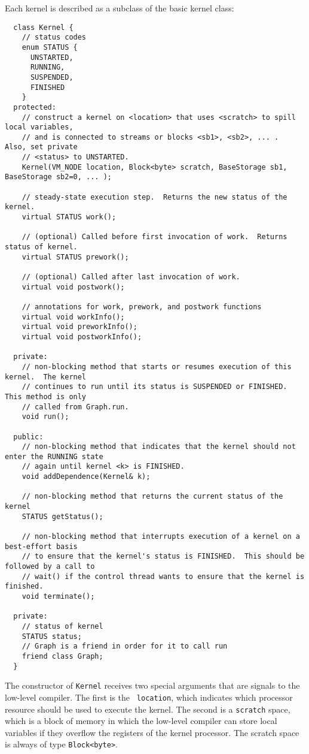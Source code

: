 Each kernel is described as a subclass of the basic kernel class:
{\small
\begin{verbatim}
  class Kernel {
    // status codes
    enum STATUS {
      UNSTARTED,
      RUNNING,
      SUSPENDED,
      FINISHED
    }
  protected:
    // construct a kernel on <location> that uses <scratch> to spill local variables,
    // and is connected to streams or blocks <sb1>, <sb2>, ... .  Also, set private 
    // <status> to UNSTARTED.
    Kernel(VM_NODE location, Block<byte> scratch, BaseStorage sb1, BaseStorage sb2=0, ... );

    // steady-state execution step.  Returns the new status of the kernel.
    virtual STATUS work();

    // (optional) Called before first invocation of work.  Returns status of kernel.
    virtual STATUS prework();

    // (optional) Called after last invocation of work.
    virtual void postwork();

    // annotations for work, prework, and postwork functions
    virtual void workInfo();
    virtual void preworkInfo();
    virtual void postworkInfo();

  private:
    // non-blocking method that starts or resumes execution of this kernel.  The kernel 
    // continues to run until its status is SUSPENDED or FINISHED.  This method is only
    // called from Graph.run.
    void run();
   
  public:
    // non-blocking method that indicates that the kernel should not enter the RUNNING state
    // again until kernel <k> is FINISHED.
    void addDependence(Kernel& k);

    // non-blocking method that returns the current status of the kernel
    STATUS getStatus();

    // non-blocking method that interrupts execution of a kernel on a best-effort basis 
    // to ensure that the kernel's status is FINISHED.  This should be followed by a call to 
    // wait() if the control thread wants to ensure that the kernel is finished.
    void terminate();

  private:
    // status of kernel
    STATUS status;
    // Graph is a friend in order for it to call run
    friend class Graph;
  }  
\end{verbatim}}
The constructor of {\tt Kernel} receives two special arguments that
are signals to the low-level compiler.  The first is the {\tt
location}, which indicates which processor resource should be used to
execute the kernel.  The second is a {\tt scratch} space, which is a
block of memory in which the low-level compiler can store local
variables if they overflow the registers of the kernel processor.  The
scratch space is always of type {\tt Block<byte>}.

